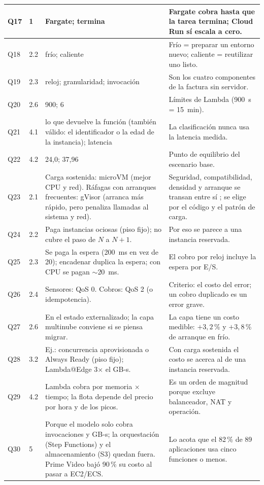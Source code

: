 \documentclass[12pt, letterpaper, table, xcdraw]{inf-pucv}
\begin{document}
{\begin{longtable}{|p{0.9cm}|p{1.1cm}|p{5.6cm}|p{6.2cm}|}
    Q17 & 1 & Fargate; termina & Fargate cobra hasta que la tarea termina; Cloud Run sí escala a cero. \\ \hline
    Q18 & 2.2 & frío; caliente & Frío = preparar un entorno nuevo; caliente = reutilizar uno listo. \\ \hline
    Q19 & 2.3 & reloj; granularidad; invocación & Son los cuatro componentes de la factura sin servidor. \\ \hline
    Q20 & 2.6 & 900; 6 & Límites de Lambda (900~s = 15~min). \\ \hline
    Q21 & 4.1 & lo que devuelve la función (también válido: el identificador o la edad de la instancia); latencia & La clasificación nunca usa la latencia medida. \\ \hline
    Q22 & 4.2 & 24,0; 37,96 & Punto de equilibrio del escenario base. \\ \hline
    Q23 & 2.1 & Carga sostenida: microVM (mejor CPU y red). Ráfagas con arranques frecuentes: gVisor (arranca más rápido, pero penaliza llamadas al sistema y red). & Seguridad, compatibilidad, densidad y arranque se transan entre sí \parencite{wang2022}; se elige por el código y el patrón de carga. \\ \hline
    Q24 & 2.2 & Paga instancias ociosas (piso fijo); no cubre el paso de $N$ a $N+1$. & Por eso se parece a una instancia reservada. \\ \hline
    Q25 & 2.3 & Se paga la espera (200~ms en vez de 20); encadenar duplica la espera; con CPU se pagan $\sim$20~ms. & El cobro por reloj incluye la espera por E/S. \\ \hline
    Q26 & 2.4 & Sensores: QoS 0. Cobros: QoS 2 (o idempotencia). & Criterio: el costo del error; un cobro duplicado es un error grave. \\ \hline
    Q27 & 2.6 & En el estado externalizado; la capa multinube conviene si se piensa migrar. & La capa tiene un costo medible: $+3{,}2$\,\% y $+3{,}8$\,\% de arranque en frío. \\ \hline
    Q28 & 3.2 & Ej.: concurrencia aprovisionada o Always Ready (piso fijo); Lambda@Edge 3$\times$ el GB-s. & Con carga sostenida el costo se acerca al de una instancia reservada. \\ \hline
    Q29 & 4.2 & Lambda cobra por memoria $\times$ tiempo; la flota depende del precio por hora y de los picos. & Es un orden de magnitud porque excluye balanceador, NAT y operación. \\ \hline
    Q30 & 5 & Porque el modelo solo cobra invocaciones y GB-s; la orquestación (Step Functions) y el almacenamiento (S3) quedan fuera. Prime Video bajó 90\,\% su costo al pasar a EC2/ECS. & Lo acota que el 82\,\% de 89 aplicaciones usa cinco funciones o menos. \\ \hline
\end{longtable}
}

\clearpage
\end{document}
